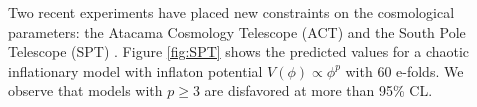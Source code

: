 \documentclass{rmaa}
\begin{document}








  



Two recent experiments have placed new constraints on the cosmological parameters: the Atacama
Cosmology Telescope (ACT) \citet{ACT} and the South Pole Telescope (SPT) \citet{SPT}.
Figure \ref{fig:SPT} shows the predicted values for a chaotic inflationary model with inflaton
potential $V(\phi)\propto\phi^p$ with 60 e-folds. We observe that models with $p\ge3$
are disfavored at more than 95\% CL.
\\
\end{document}
